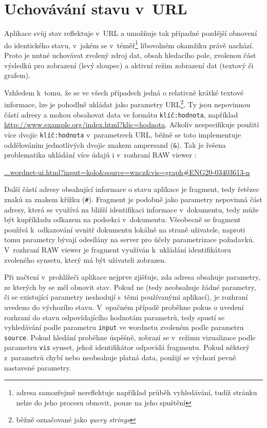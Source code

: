 \documentclass[a4paper,11pt,openany,twoside]{book}
\newcommand{\simplywn}{RAW viewer }
\begin{document}
			\section{Uchovávání stavu v~URL}

				Aplikace svůj stav reflektuje v~URL a umožňuje tak případné pozdější obnovení do identického stavu, v~jakém se v~téměř\footnote{adresa samozřejmě nereflektuje například průběh vyhledávání, tudíž stránku nelze do jeho procesu obnovit, pouze na jeho spuštění} libovolném okamžiku právě nachází. Proto je nutné uchovávat zvolený zdroj dat, obsah hledacího pole, zvolenou část výsledků pro zobrazení (levý sloupec) a aktivní režim zobrazení dat (textový či grafem). 

				Vzhledem k~tomu, že se ve všech případech jedná o relativně krátké textové informace, lze je pohodlně ukládat jako parametry URL\footnote{běžně označované jako \textit{query strings}}. Ty jsou nepovinnou částí adresy a mohou obsahovat data ve formátu \texttt{klíč:hodnota}, například \url{http://www.example.org/index.html?klic=hodnota}. \parencite{berners2005uniform} Ačkoliv \textcite{berners2005uniform} nespecifikuje použití více dvojic \texttt{klíč:hodnota} v~parametrech URL, běžně se toto implementuje oddělováním jednotlivých dvojic znakem ampersand (\texttt{\&}). Tak je řešena problematika ukládání více údajů i v~rozhraní \simplywn: 

				\medskip
				\url{...wordnet-ui.html?input=kolo&source=wncz&vis=graph#ENG20-03403613-n}
				\medskip

				Další částí adresy obsahující informace o stavu aplikace je fragment, tedy řetězec znaků za znakem křížku (\texttt{\#}). Fragment je podobně jako parametry nepovinná část adresy, která se využívá na bližší identifikaci informace v~dokumentu, tedy může být kupříkladu odkazem na podsekci v~dokumentu. \parencite{berners2005uniform} Všeobecně se fragment používá k~odkazování uvnitř dokumentu lokálně na straně uživatele, naproti tomu parametry bývají odesílány na server pro účely parametrizace požadavků. V~rozhraní \simplywn je fragment využíván k~ukládání identifikátoru zvoleného synsetu, který má být uživateli zobrazen.

				Při načtení v~prohlížeči aplikace nejprve zjišťuje, zda adresa obsahuje parametry, ze kterých by se měl obnovit stav. Pokud ne (tedy neobsahuje žádné parametry, či se existující parametry neshodují s~těmi používanými aplikací), je rozhraní uvedeno do výchozího stavu. V~opačném případě proběhne pokus o uvedení rozhraní do stavu odpovídajícího hodnotám parametrů, tedy spustí se vyhledávání podle parametru \texttt{input} ve wordnetu zvoleném podle parametru \texttt{source}. Pokud hledání proběhne úspěšně, zobrazí se v~režimu vizualizace podle parametru \texttt{vis} synset, jehož identifikátor odpovídá fragmentu. Pokud některý z~parametrů chybí nebo neobsahuje platná data, použijí se výchozí pevně nastavené parametry.
\end{document}

